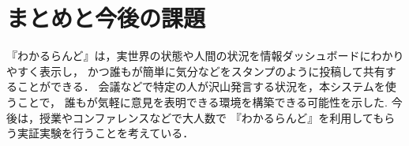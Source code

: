 \section{まとめと今後の課題}
『わかるらんど』は，実世界の状態や人間の状況を情報ダッシュボードにわかりやすく表示し，
かつ誰もが簡単に気分などをスタンプのように投稿して共有することができる．
会議などで特定の人が沢山発言する状況を，本システムを使うことで，
誰もが気軽に意見を表明できる環境を構築できる可能性を示した.
今後は，授業やコンファレンスなどで大人数で
『わかるらんど』を利用してもらう実証実験を行うことを考えている．